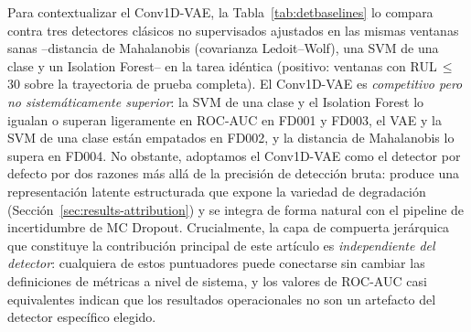 \documentclass[5p,times,authoryear]{elsarticle}
\begin{document}
\begin{table}[!t]
\centering
\caption{Detección de anomalías a nivel de ventana. El mejor en negrita por conjunto de datos.}
\label{tab:vae}
\small
{}
\end{table}

Para contextualizar el Conv1D-VAE, la Tabla~\ref{tab:detbaselines} lo compara contra tres detectores clásicos no supervisados ajustados en las mismas ventanas sanas --distancia de Mahalanobis (covarianza Ledoit--Wolf), una SVM de una clase y un Isolation Forest-- en la tarea idéntica (positivo: ventanas con RUL\,$\le$\,30 sobre la trayectoria de prueba completa). El Conv1D-VAE es \emph{competitivo pero no sistemáticamente superior}: la SVM de una clase y el Isolation Forest lo igualan o superan ligeramente en ROC-AUC en FD001 y FD003, el VAE y la SVM de una clase están empatados en FD002, y la distancia de Mahalanobis lo supera en FD004. No obstante, adoptamos el Conv1D-VAE como el detector por defecto por dos razones más allá de la precisión de detección bruta: produce una representación latente estructurada que expone la variedad de degradación (Sección~\ref{sec:results-attribution}) y se integra de forma natural con el pipeline de incertidumbre de MC Dropout. Crucialmente, la capa de compuerta jerárquica que constituye la contribución principal de este artículo es \emph{independiente del detector}: cualquiera de estos puntuadores puede conectarse sin cambiar las definiciones de métricas a nivel de sistema, y los valores de ROC-AUC casi equivalentes indican que los resultados operacionales no son un artefacto del detector específico elegido.
\end{document}
